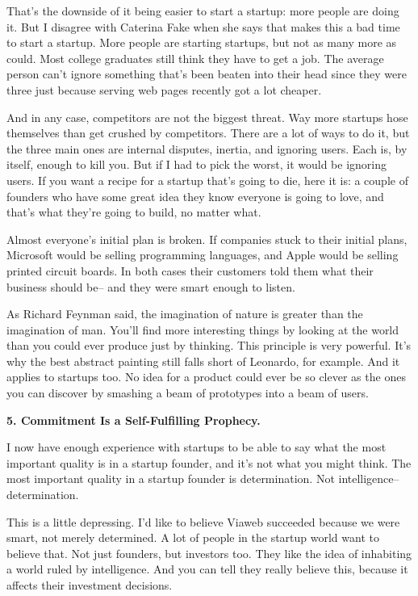 \documentclass[12pt]{book}
\begin{document}
That's the downside of it being easier to start a startup: more people
are doing it. But I disagree with Caterina Fake when she says that makes
this a bad time to start a startup. More people are starting startups,
but not as many more as could. Most college graduates still think they
have to get a job. The average person can't ignore something that's been
beaten into their head since they were three just because serving web
pages recently got a lot cheaper.

And in any case, competitors are not the biggest threat. Way more
startups hose themselves than get crushed by competitors. There are a
lot of ways to do it, but the three main ones are internal disputes,
inertia, and ignoring users. Each is, by itself, enough to kill you. But
if I had to pick the worst, it would be ignoring users. If you want a
recipe for a startup that's going to die, here it is: a couple of
founders who have some great idea they know everyone is going to love,
and that's what they're going to build, no matter what.

Almost everyone's initial plan is broken. If companies stuck to their
initial plans, Microsoft would be selling programming languages, and
Apple would be selling printed circuit boards. In both cases their
customers told them what their business should be-- and they were smart
enough to listen.

As Richard Feynman said, the imagination of nature is greater than the
imagination of man. You'll find more interesting things by looking at
the world than you could ever produce just by thinking. This principle
is very powerful. It's why the best abstract painting still falls short
of Leonardo, for example. And it applies to startups too. No idea for a
product could ever be so clever as the ones you can discover by smashing
a beam of prototypes into a beam of users.

\textbf{5. Commitment Is a Self-Fulfilling Prophecy.}

I now have enough experience with startups to be able to say what the
most important quality is in a startup founder, and it's not what you
might think. The most important quality in a startup founder is
determination. Not intelligence-- determination.

This is a little depressing. I'd like to believe Viaweb succeeded
because we were smart, not merely determined. A lot of people in the
startup world want to believe that. Not just founders, but investors
too. They like the idea of inhabiting a world ruled by intelligence. And
you can tell they really believe this, because it affects their
investment decisions.
\end{document}
